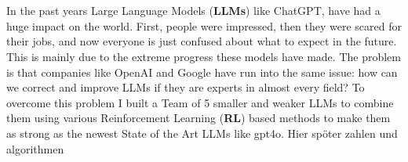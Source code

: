 \chapter{\abstractname}

In the past years Large Language Models (\textbf{LLMs}) like ChatGPT, have had a huge impact on the world. First, people were impressed, then they were scared for their jobs, and now everyone is just confused about what to expect in the future. This is mainly due to the extreme progress these models have made. The problem is that companies like OpenAI and Google have run into the same issue: how can we correct and improve LLMs if they are experts in almost every field? To overcome this problem I built a Team of 5 smaller and weaker LLMs to combine them using various Reinforcement Learning (\textbf{RL}) based methods to make them as strong as the newest State of the Art LLMs like gpt4o. Hier spöter zahlen und algorithmen
